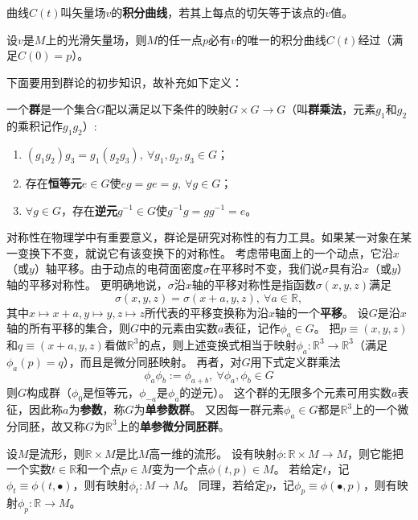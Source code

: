 \begin{definition}
曲线$C(t)$叫矢量场$v$的\textbf{积分曲线}，若其上每点的切矢等于该点的$v$值。
\end{definition}

\begin{theorem}
设$v$是$M$上的光滑矢量场，则$M$的任一点$p$必有$v$的唯一的积分曲线$C(t)$经过（满足$C(0) = p$）。
\end{theorem}

下面要用到群论的初步知识，故补充如下定义：

\begin{definition}
一个\textbf{群}是一个集合$G$配以满足以下条件的映射$G \times G \to G$（叫\textbf{群乘法}，元素$g_1$和$g_2$的乘积记作$g_1g_2$）:
\begin{enumerate}[（a）]
\item $(g_1g_2)g_3 = g_1(g_2g_3), ~ \forall g_1, g_2, g_3 \in G$；
\item 存在\textbf{恒等元}$e \in G$使$eg = ge = g, ~ \forall g \in G$；
\item $\forall g \in G$，存在\textbf{逆元}$g^{-1} \in G$使$g^{-1}g = gg^{-1} = e$。
\end{enumerate}
\end{definition}

对称性在物理学中有重要意义，群论是研究对称性的有力工具。如果某一对象在某一变换下不变，就说它有该变换下的对称性。
考虑带电面上的一个动点，它沿$x$（或$y$）轴平移。由于动点的电荷面密度$\sigma$在平移时不变，我们说$\sigma$具有沿$x$（或$y$）轴的平移对称性。
更明确地说，$\sigma$沿$x$轴的平移对称性是指函数$\sigma(x, y, z)$满足
$$\sigma(x, y, z) = \sigma(x + a, y, z), ~ \forall a \in \mathbb{R},$$
其中$x \mapsto x + a, y \mapsto y, z \mapsto z$所代表的平移变换称为沿$x$轴的一个\textbf{平移}。
设$G$是沿$x$轴的所有平移的集合，则$G$中的元素由实数$a$表征，记作$\phi_a \in G$。
把$p \equiv (x, y, z)$和$q \equiv (x + a, y, z)$看做$\mathbb{R}^3$的点，则上述变换式相当于映射$\phi_a \colon \mathbb{R}^3 \to \mathbb{R}^3$（满足$\phi_a(p) = q$），而且是微分同胚映射。
再者，对$G$用下式定义群乘法
$$\phi_a\phi_b := \phi_{a + b}, ~ \forall \phi_a, \phi_b \in G$$
则$G$构成群（$\phi_0$是恒等元，$\phi_{-a}$是$\phi_a$的逆元）。
这个群的无限多个元素可用实数$a$表征，因此称$a$为\textbf{参数}，称$G$为\textbf{单参数群}。
又因每一群元素$\phi_a \in G$都是$\mathbb{R}^3$上的一个微分同胚，故又称$G$为$\mathbb{R}^3$上的\textbf{单参微分同胚群}。

设$M$是流形，则$\mathbb{R} \times M$是比$M$高一维的流形。
设有映射$\phi \colon \mathbb{R} \times M \to M$，则它能把一个实数$t \in \mathbb{R}$和一个点$p \in M$变为一个点$\phi(t, p) \in M$。
若给定$t$，记$\phi_t \equiv \phi(t, \bullet)$，则有映射$\phi_t \colon M \to M$。
同理，若给定$p$，记$\phi_p \equiv \phi(\bullet, p)$，则有映射$\phi_p \colon \mathbb{R} \to M$。

